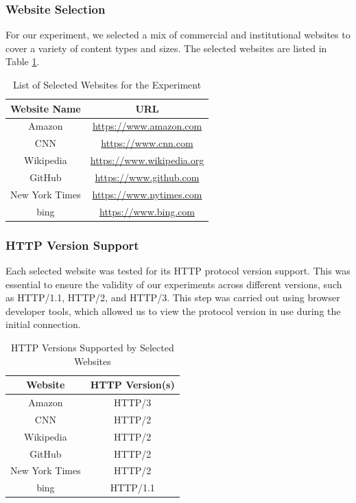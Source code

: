 \documentclass[a4paper,10pt]{article}
\begin{document}
\subsubsection{Website Selection}
For our experiment, we selected a mix of commercial and institutional websites to cover a variety of content types and sizes. The selected websites are listed in Table \ref{tab:website_selection}.

\begin{table}[H]
\centering
\begin{tabular}{|c|c|}
\hline
\textbf{Website Name} & \textbf{URL} \\
\hline
Amazon & \url{https://www.amazon.com} \\
CNN & \url{https://www.cnn.com} \\
Wikipedia & \url{https://www.wikipedia.org} \\
GitHub & \url{https://www.github.com} \\
New York Times & \url{https://www.nytimes.com} \\
bing & \url{https://www.bing.com} \\
\hline
\end{tabular}
\caption{List of Selected Websites for the Experiment}
\label{tab:website_selection}
\end{table}

\subsubsection{HTTP Version Support}
Each selected website was tested for its HTTP protocol version support. This was essential to ensure the validity of our experiments across different versions, such as HTTP/1.1, HTTP/2, and HTTP/3. This step was carried out using browser developer tools, which allowed us to view the protocol version in use during the initial connection.

\begin{table}[H]
\centering
\begin{tabular}{|c|c|}
\hline
\textbf{Website} & \textbf{HTTP Version(s)} \\
\hline
Amazon & HTTP/3 \\
CNN & HTTP/2\\
Wikipedia & HTTP/2 \\
GitHub & HTTP/2 \\
New York Times & HTTP/2 \\
bing & HTTP/1.1\\
\hline
\end{tabular}
\caption{HTTP Versions Supported by Selected Websites}
\label{tab:http_versions}
\end{table}
\end{document}
